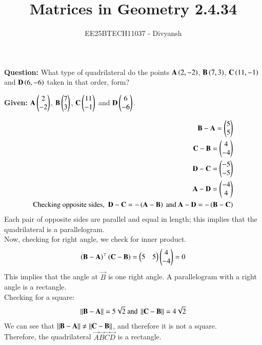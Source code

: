 \documentclass[journal,12pt,onecolumn]{IEEEtran}
\title{Matrices in Geometry 2.4.34}
\author{EE25BTECH11037 - Divyansh}
\theoremstyle{remark}
\begin{document}
\vspace{3cm}
\maketitle
{\let\newpage\relax\maketitle}
\textbf{Question: }
What type of quadrilateral do the points $\mathbf{A}\left(2,-2\right)$, $\mathbf{B}\left(7,3\right)$, $\mathbf{C}\left(11,-1\right)$ and $\mathbf{D}\left(6,-6\right)$ taken in that order, form?


\textbf{Given: } $\mathbf{A}\begin{pmatrix}2\\-2\end{pmatrix}$, $\mathbf{B}\begin{pmatrix}7\\3\end{pmatrix}$, $\mathbf{C}\begin{pmatrix}11 \\ -1\end{pmatrix}$ and $\mathbf{D}\begin{pmatrix}6 \\ -6\end{pmatrix}$.
 

\begin{align}
    \vec{B}- \vec{A}=\myvec{5 \\ 5} \\
    \vec{C}- \vec{B}=\myvec{4 \\ -4} \\
    \vec{D}- \vec{C}=\myvec{-5 \\ -5} \\
    \vec{A}- \vec{D}=\myvec{-4 \\ 4} \\
    \text{Checking opposite sides, } \ \vec{D}-\vec{C}=-\brak{\vec{A}-\vec{B}} \text{ and } \vec{A}-\vec{D}=-\brak{\vec{B}-\vec{C}}\\
\end{align}
Each pair of opposite sides are parallel and equal in length; this implies that the quadrilateral is a parallelogram.\\
Now, checking for right angle, we check for inner product.
\begin{align}
 \left(\mathbf{B}- \mathbf{A}\right)^{\top} \left(\mathbf{C}- \mathbf{B}\right)=\begin{pmatrix}5 & 5\end{pmatrix}\begin{pmatrix}4 \\ -4\end{pmatrix}=0
\end{align}
This implies that the angle at $\vec{B}$ is one right angle. A parallelogram with a right angle is a rectangle.\\
Checking for a square:
\begin{align}
    \left\lVert\mathbf{B}- \mathbf{A}\right\rVert=5\sqrt{2} \text{ and } \left\lVert\mathbf{C}- \mathbf{B}\right\rVert=4\sqrt{2} 
\end{align}
We can see that $\left\lVert\mathbf{B}-\mathbf{A}\right\rVert \neq \left\lVert\mathbf{C}-\mathbf{B}\right\rVert$, and therefore it is not a square.\\
Therefore, the quadrilateral $\vec{A}\vec{B}\vec{C}\vec{D}$ is a rectangle.
\end{document}
